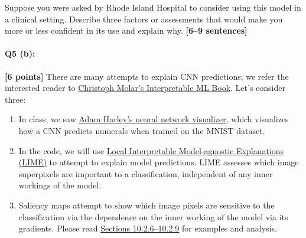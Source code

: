 \begin{tcolorbox}[colback=orange!5!white,colframe=orange!75!black]
    Suppose you were asked by Rhode Island Hospital to consider using this model in a clinical setting. Describe three factors or assessments that would make you more or less confident in its use and explain why. \textbf{[6--9 sentences]}
\end{tcolorbox}



\pagebreak 
\paragraph{Q5 (b):} \textbf{[6 points]} There are many attempts to explain CNN predictions; we refer the interested reader to \href{https://christophm.github.io/interpretable-ml-book/}{Christoph Molar's Interpretable ML Book}. Let's consider three:
\begin{enumerate}
    \item In class, we saw \href{https://adamharley.com/nn_vis/cnn/2d.html}{Adam Harley's neural network visualizer}, which visualizes how a CNN predicts numerals when trained on the MNIST dataset.
    
    \item In the code, we will use \href{https://christophm.github.io/interpretable-ml-book/lime.html#example-7}{Local Interpretable Model-agnostic Explanations (LIME)} to attempt to explain model predictions. LIME assesses which image superpixels are important to a classification, independent of any inner workings of the model.

    \item Saliency maps attempt to show which image pixels are sensitive to the classification via the dependence on the inner working of the model via its gradients. 
    Please read \href{https://christophm.github.io/interpretable-ml-book/pixel-attribution.html#examples-6}{Sections 10.2.6--10.2.9} for examples and analysis. 
\end{enumerate}

